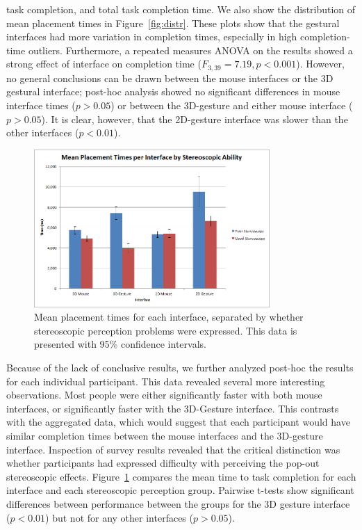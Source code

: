 \documentclass[pageno]{jpaper}
\begin{document}
task completion, and total task completion time. We also show the distribution
of mean placement times in Figure~\ref{fig:distr}. These plots show that the gestural interfaces had more variation in completion times, especially in high completion-time
outliers. Furthermore, a repeated measures ANOVA on the results showed a strong effect of
interface on completion time ($F_{3,39}=7.19, p < 0.001$).
However, no general conclusions can be drawn between the mouse interfaces or the 3D gestural interface; post-hoc analysis showed no significant differences
in mouse interface times ($p > 0.05$) or between the 3D-gesture and either mouse interface ($p > 0.05$). It is clear, however, that the 2D-gesture interface
was slower than the other interfaces ($p < 0.01$).

\begin{figure}
\centering
\includegraphics[width=0.8\textwidth]{figures/mean.png}
\caption{Mean placement times for each interface, separated by whether
stereoscopic perception problems were expressed. This data is presented with 95\% confidence intervals.}
\label{fig:sepmean}
\end{figure}
Because of the lack of conclusive results, we further analyzed post-hoc the results for each individual participant. This data revealed several more interesting observations.
Most people were either significantly faster with both mouse interfaces, or significantly faster with the 3D-Gesture interface.
This contrasts with the aggregated data, which would suggest that each participant would have similar completion times between the mouse interfaces and the 3D-gesture
interface. Inspection of survey results revealed that the critical distinction
was whether participants had expressed difficulty with perceiving
the pop-out stereoscopic effects. Figure~\ref{fig:sepmean} compares the mean
time to task completion for each interface and each stereoscopic perception
group. Pairwise t-tests show significant differences between performance between
the groups for the 3D gesture interface ($p < 0.01$) but not for any other
interfaces ($p > 0.05$).
\end{document}
